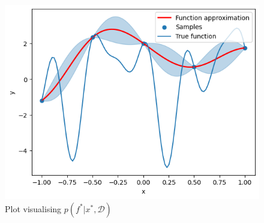 \begin{figure}[h]
\centering
\includegraphics[width=0.5\linewidth]{images/f_star.png}
\setlength{\belowcaptionskip}{-10pt}
\caption{Plot visualising $p(f^*|x^*, \mathcal{D})$}
\label{fig:f_star}
\end{figure}
